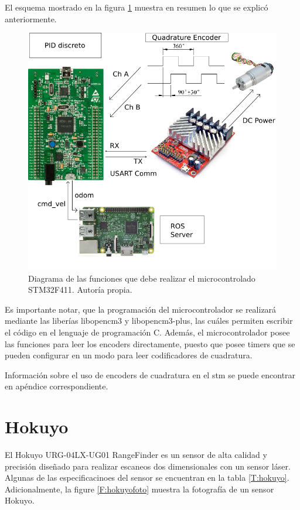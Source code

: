 El esquema mostrado en la figura \ref{F:diagrama_stm} muestra en resumen lo que se explicó anteriormente.

\begin{figure}[H]
\centering
\includegraphics[scale=0.5]{imagenes/microcontrolador_diagrama.png}
\caption{Diagrama de las funciones que debe realizar el microcontrolado STM32F411. Autoría propia.}
\label{F:diagrama_stm}
\end{figure}

Es importante notar, que la programación del microcontrolador se realizará mediante las liberías libopencm3 y libopencm3-plus, las cuáles permiten escribir el código en el lenguaje de programación C. Además, el microcontrolador posee las funciones para leer los encoders directamente, puesto que posee timers que se pueden configurar en un modo para leer codificadores de cuadratura.

Información sobre el uso de encoders de cuadratura en el stm se puede encontrar en apéndice correspondiente.

\section{Hokuyo}

El Hokuyo URG-04LX-UG01 RangeFinder es un sensor de alta calidad y precisión diseñado para realizar escaneos dos dimensionales con un sensor láser. Algunas de las especificacinoes del sensor se encuentran en la tabla \ref{T:hokuyo}. Adicionalmente, la figure \ref{F:hokuyofoto} muestra la fotografía de un sensor Hokuyo.

